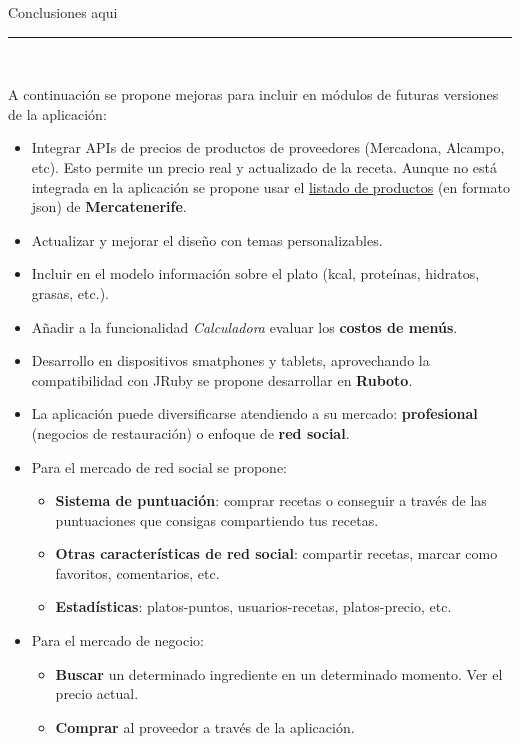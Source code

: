 
Conclusiones aqui

\begin{center}
	\rule{80mm}{0.3mm}\\
\end{center}

A continuación se propone mejoras para incluir en módulos de futuras versiones de la aplicación:

\begin{itemize}
\item Integrar APIs de precios de productos de proveedores (Mercadona, Alcampo, etc). Esto permite un precio real y actualizado de la receta. Aunque no está integrada en la aplicación se propone usar el \href{http://www.opendatacanarias.es/datos/dataset/mercatenerife-precios-de-productos-hortofruticolas-de-tenerife}{listado de productos} (en formato json) de \textbf{Mercatenerife}.

\item Actualizar y mejorar el diseño con temas personalizables.
\item Incluir en el modelo información sobre el plato (kcal, proteínas, hidratos, grasas, etc.).
\item Añadir a la funcionalidad \emph{Calculadora} evaluar los \textbf{costos de menús}.
\item Desarrollo en dispositivos smatphones y tablets, aprovechando la compatibilidad con JRuby se propone desarrollar en \textbf{Ruboto}.

\item La aplicación puede diversificarse atendiendo a su mercado: \textbf{profesional} (negocios de restauración) o enfoque de \textbf{red social}.
	\item Para el mercado de red social se propone:
		\begin{itemize}
			\item \textbf{Sistema de puntuación}: comprar recetas o conseguir a través de las puntuaciones que consigas compartiendo tus recetas.
			\item \textbf{Otras características de red social}: compartir recetas, marcar como favoritos, comentarios, etc.
			\item \textbf{Estadísticas}: platos-puntos, usuarios-recetas, platos-precio, etc.
		\end{itemize}
	\item Para el mercado de negocio:
		\begin{itemize}
			\item \textbf{Buscar} un determinado ingrediente en un determinado momento. Ver el precio actual.
			\item \textbf{Comprar} al proveedor a través de la aplicación.
		\end{itemize}

\end{itemize}
